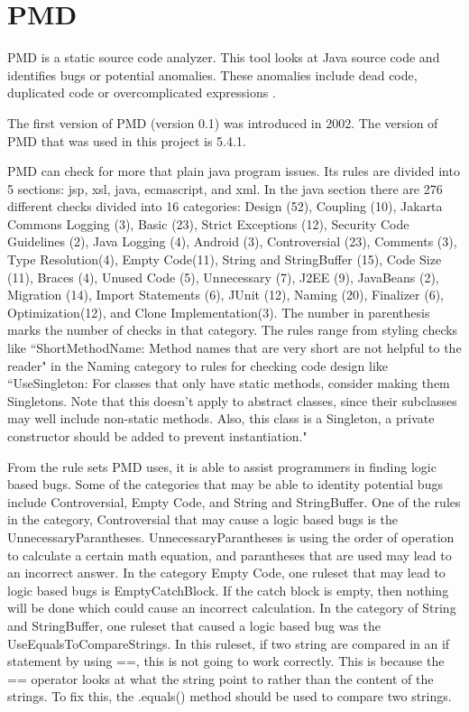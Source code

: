 \chapter{PMD}\label{ch:pmd}

PMD is a static source code analyzer. This tool looks at Java source code and identifies bugs or potential anomalies. These anomalies include dead code, duplicated code or overcomplicated expressions \cite{Urma}.

The first version of PMD (version 0.1) was introduced in 2002. The version of PMD that was used in this project is 5.4.1. 

PMD can check for more that plain java program issues. Its rules are divided into 5 sections: jsp, xsl, java, ecmascript, and xml. In the java section there are 276 different checks divided into 16 categories: Design (52), Coupling (10), Jakarta Commons Logging (3), Basic (23), Strict Exceptions (12), Security Code Guidelines (2), Java Logging (4), Android (3), Controversial (23), Comments (3), Type Resolution(4), Empty Code(11), String and StringBuffer (15), Code Size (11), Braces (4), Unused Code (5), Unnecessary (7), J2EE (9), JavaBeans (2), Migration (14), Import Statements (6), JUnit (12), Naming (20), Finalizer (6), Optimization(12), and Clone Implementation(3). The number in parenthesis marks the number of checks in that category. The rules range from styling checks like ``ShortMethodName: Method names that are very short are not helpful to the reader" in the Naming category to rules for checking code design like ``UseSingleton: For classes that only have static methods, consider making them Singletons. Note that this doesn't apply to abstract classes, since their subclasses may well include non-static methods. Also, this class is a Singleton, a private constructor should be added to prevent instantiation."

From the rule sets PMD uses, it is able to assist programmers in finding logic based bugs. Some of the categories that may be able to identity potential bugs include Controversial, Empty Code, and String and StringBuffer. One of the rules in the category, Controversial that may cause a logic based bugs is the UnnecessaryParantheses. UnnecessaryParantheses is using the order of operation to calculate a certain math equation, and parantheses that are used may lead to an incorrect answer. In the category Empty Code, one ruleset that may lead to logic based bugs is EmptyCatchBlock. If the catch block is empty, then nothing will be done which could cause an incorrect calculation. In the category of String and StringBuffer, one ruleset that caused a logic based bug was the UseEqualsToCompareStrings. In this ruleset, if two string are compared in an if statement by using ==, this is not going to work correctly. This is because the == operator looks at what the string point to rather than the content of the strings. To fix this, the .equals() method should be used to compare two strings.

